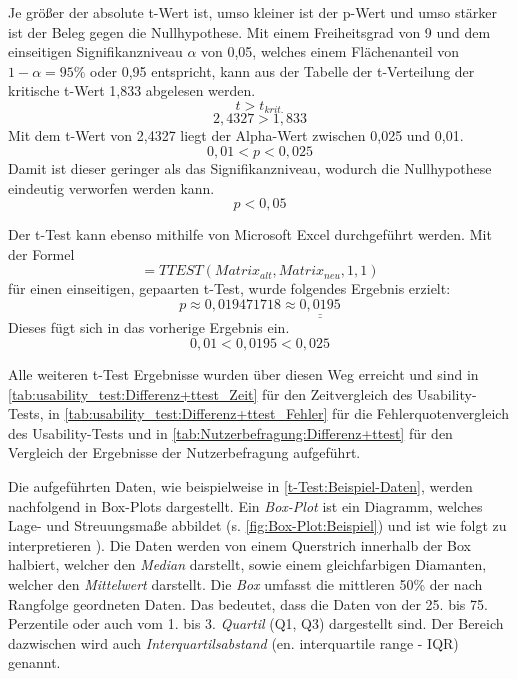 \noindent
Je größer der absolute t-Wert ist, umso kleiner ist der p-Wert und umso stärker ist der Beleg gegen die Nullhypothese. Mit einem Freiheitsgrad von 9 und dem einseitigen Signifikanzniveau $\alpha$ von 0,05, welches einem Flächenanteil von $1-\alpha = 95\%$ oder 0,95 entspricht, kann aus der Tabelle der t-Verteilung der kritische t-Wert 1,833 abgelesen werden. \cites[S. 1042\psq]{Statistik:Sedlmeier:2018}[S. 600\psqq]{Statistik:Boertz:2010}    %
$$t > t_{krit.}$$
$$2,4327 > 1,833$$
Mit dem t-Wert von 2,4327 liegt der Alpha-Wert zwischen 0,025 und 0,01.
$$ \displaystyle 0,01 < p < 0,025$$
Damit ist dieser geringer als das Signifikanzniveau, wodurch die Nullhypothese eindeutig verworfen werden kann.
$$ \displaystyle p < 0,05$$

\noindent
Der t-Test kann ebenso mithilfe von Microsoft Excel durchgeführt werden. Mit der Formel 
$$=TTEST(Matrix_{alt}, Matrix_{neu},1,1)$$
für einen einseitigen, gepaarten t-Test, wurde folgendes Ergebnis erzielt:
$$ \displaystyle p \approx 0,019471718 \approx \underline{\underline{0,0195}} $$
Dieses fügt sich in das vorherige Ergebnis ein.
$$0,01 < 0,0195 < 0,025$$

\noindent
Alle weiteren t-Test Ergebnisse wurden über diesen Weg erreicht und sind in \autoref{tab:usability_test:Differenz+ttest_Zeit} für den Zeitvergleich des Usability-Tests, in \autoref{tab:usability_test:Differenz+ttest_Fehler} für die Fehlerquotenvergleich des Usability-Tests und in \autoref{tab:Nutzerbefragung:Differenz+ttest} für den Vergleich der Ergebnisse der Nutzerbefragung aufgeführt.

Die aufgeführten Daten, wie beispielweise in \autoref{t-Test:Beispiel-Daten}, werden nachfolgend in Box-Plots dargestellt. 
Ein \textit{Box-Plot} ist ein Diagramm, welches Lage- und Streuungsmaße abbildet (s. \autoref{fig:Box-Plot:Beispiel}) und ist wie folgt zu interpretieren \cite[Zusammenfassung nach][S. 194\psqq]{Statistik:Sedlmeier:2018}). Die Daten werden von einem Querstrich innerhalb der Box halbiert, welcher den \textit{Median} darstellt, sowie einem gleichfarbigen Diamanten, welcher den \textit{Mittelwert} darstellt. Die \textit{Box} umfasst die mittleren 50\% der nach Rangfolge geordneten Daten. Das bedeutet, dass die Daten von der 25. bis 75. Perzentile oder auch vom 1. bis 3. \textit{Quartil} (Q1, Q3) dargestellt sind. Der Bereich dazwischen wird auch \textit{Interquartilsabstand} (en. interquartile range - IQR) genannt.

